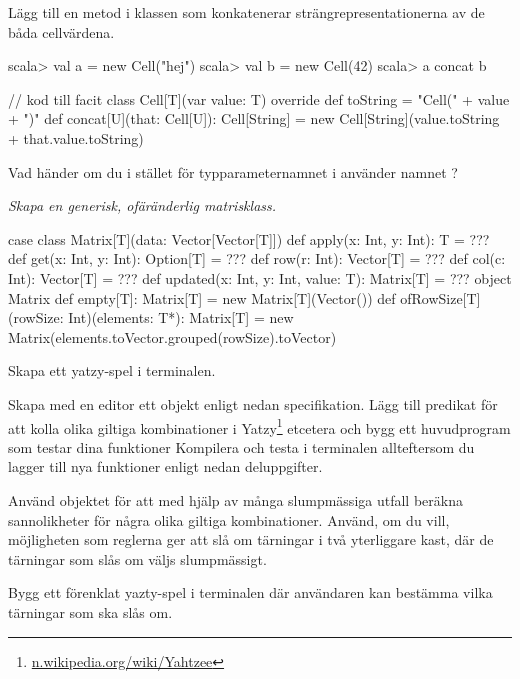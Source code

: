 \Subtask Lägg till en metod  i klassen  som konkatenerar strängrepresentationerna av de båda cellvärdena.

\begin{REPL}
scala> val a = new Cell("hej")
scala> val b = new Cell(42)
scala> a concat b
\end{REPL}

\begin{Code}
// kod till facit
class Cell[T](var value: T){
  override def toString = "Cell(" + value + ")"
  def concat[U](that: Cell[U]): Cell[String] = 
    new Cell[String](value.toString + that.value.toString)
}
\end{Code}

\Subtask\Pen Vad händer om du i stället för typparameternamnet  i  använder namnet ?

\Task \emph{Skapa en generisk, ofäränderlig matrisklass.}

\begin{Code}
case class Matrix[T](data: Vector[Vector[T]]) {
  def apply(x: Int, y: Int): T = ???
  def get(x: Int, y: Int): Option[T] = ???
  def row(r: Int): Vector[T] = ???
  def col(c: Int): Vector[T] = ???
  def updated(x: Int, y: Int, value: T): Matrix[T] = ???
}
object Matrix {
  def empty[T]: Matrix[T] = new Matrix[T](Vector())
  def ofRowSize[T](rowSize: Int)(elements: T*): Matrix[T] =
    new Matrix(elements.toVector.grouped(rowSize).toVector)
}
\end{Code}

\Subtask 

\ExtraTasks %

\Task Skapa ett yatzy-spel i terminalen.

\Subtask Skapa med en editor ett objekt enligt nedan specifikation. Lägg till predikat för att kolla olika giltiga kombinationer i Yatzy\footnote{\href{https://en.wikipedia.org/wiki/Yahtzee}{n.wikipedia.org/wiki/Yahtzee}} etcetera och bygg ett huvudprogram som testar dina funktioner Kompilera och testa i terminalen allteftersom du lagger till nya funktioner enligt nedan deluppgifter.

\Subtask Använd objektet för att med hjälp av många slumpmässiga utfall beräkna sannolikheter för några olika giltiga kombinationer. Använd, om du vill, möjligheten som reglerna ger att slå om tärningar i två yterliggare kast, där de tärningar som slås om väljs slumpmässigt.

\Subtask Bygg ett förenklat yazty-spel i terminalen där användaren kan bestämma vilka tärningar som ska slås om.

